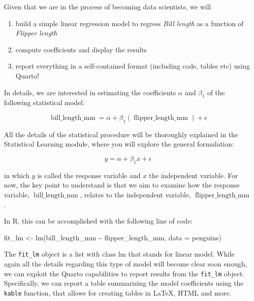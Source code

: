 \documentclass[
  letterpaper,
  DIV=11,
  numbers=noendperiod]{scrartcl}
\newenvironment{Shaded}{\begin{snugshade}}{\end{snugshade}}
\newcommand{\AttributeTok}[1]{\textcolor[rgb]{0.40,0.45,0.13}{#1}}
\newcommand{\FunctionTok}[1]{\textcolor[rgb]{0.28,0.35,0.67}{#1}}
\newcommand{\NormalTok}[1]{\textcolor[rgb]{0.00,0.23,0.31}{#1}}
\newcommand{\OtherTok}[1]{\textcolor[rgb]{0.00,0.23,0.31}{#1}}
\newcommand{\SpecialCharTok}[1]{\textcolor[rgb]{0.37,0.37,0.37}{#1}}
\providecommand{\tightlist}{%
  \setlength{\itemsep}{0pt}\setlength{\parskip}{0pt}}
\begin{document}
Given that we are in the process of becoming data scientists, we will

\begin{enumerate}
\def\labelenumi{\arabic{enumi}.}
\tightlist
\item
  build a simple linear regression model to regress \emph{Bill length}
  as a function of \emph{Flipper length}
\item
  compute coefficients and display the results
\item
  report everything in a self-contained format (including code, tables
  etc) using Quarto!
\end{enumerate}

In details, we are interested in estimating the coefficients \(\alpha\)
and \(\beta_{1}\) of the following statistical model:

\[
\operatorname{bill\_length\_mm} = \alpha + \beta_{1}(\operatorname{flipper\_length\_mm}) + \epsilon
\]

All the details of the statistical procedure will be thoroughly
explained in the Statistical Learning module, where you will explore the
general formulation:

\[
y=\alpha + \beta_1 x + \epsilon
\]

in which \(y\) is called the response variable and \(x\) the independent
variable. For now, the key point to understand is that we aim to examine
how the response variable, \(\operatorname{bill\_length\_mm}\), relates
to the independent variable, \(\operatorname{flipper\_length\_mm}\).

In R, this can be accomplished with the following line of code:

\begin{Shaded}
\begin{Highlighting}[]
\NormalTok{fit\_lm }\OtherTok{\textless{}{-}} \FunctionTok{lm}\NormalTok{(bill\_length\_mm }\SpecialCharTok{\textasciitilde{}}\NormalTok{ flipper\_length\_mm, }\AttributeTok{data =}\NormalTok{ penguins)}
\end{Highlighting}
\end{Shaded}

The \texttt{fit\_lm} object is a list with class lm that stands for
linear model. While again all the details regarding this type of model
will become clear soon enough, we can exploit the Quarto capabilities to
report results from the \texttt{fit\_lm} object. Specifically, we can
report a table summarizing the model coefficients using the
\texttt{kable} function, that allows for creating tables in LaTeX, HTML
and more.
\end{document}
